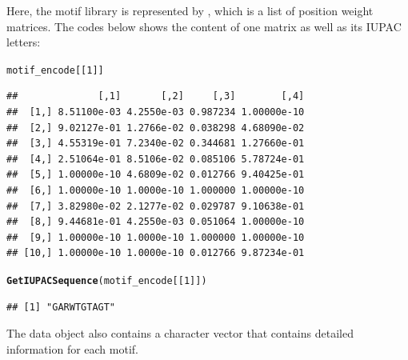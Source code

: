 \documentclass[a4paper,10pt]{article}\usepackage[]{graphicx}\usepackage[]{color}
\makeatletter
\newcommand{\hlnum}[1]{\textcolor[rgb]{0.686,0.059,0.569}{#1}}%
\newcommand{\hlstd}[1]{\textcolor[rgb]{0.345,0.345,0.345}{#1}}%
\newcommand{\hlkwd}[1]{\textcolor[rgb]{0.737,0.353,0.396}{\textbf{#1}}}%
\newenvironment{kframe}{%
 \def\at@end@of@kframe{}%
 \ifinner\ifhmode%
  \def\at@end@of@kframe{\end{minipage}}%
  \begin{minipage}{\columnwidth}%
 \fi\fi%
 \def\FrameCommand##1{\hskip\@totalleftmargin \hskip-\fboxsep
 \colorbox{shadecolor}{##1}\hskip-\fboxsep
     \hskip-\linewidth \hskip-\@totalleftmargin \hskip\columnwidth}%
 \MakeFramed {\advance\hsize-\width
   \@totalleftmargin\z@ \linewidth\hsize
   \@setminipage}}%
 {\par\unskip\endMakeFramed%
 \at@end@of@kframe}
\newenvironment{knitrout}{}{} %
\makeatother
\begin{document}
Here, the motif library is represented by ,
which is a list of position weight matrices. The codes below shows the
content of one matrix as well as its IUPAC letters:

\begin{knitrout}
\color{fgcolor}\begin{kframe}
\begin{alltt}
\hlstd{motif_encode[[}\hlnum{1}\hlstd{]]}
\end{alltt}
\begin{verbatim}
##              [,1]       [,2]     [,3]        [,4]
##  [1,] 8.51100e-03 4.2550e-03 0.987234 1.00000e-10
##  [2,] 9.02127e-01 1.2766e-02 0.038298 4.68090e-02
##  [3,] 4.55319e-01 7.2340e-02 0.344681 1.27660e-01
##  [4,] 2.51064e-01 8.5106e-02 0.085106 5.78724e-01
##  [5,] 1.00000e-10 4.6809e-02 0.012766 9.40425e-01
##  [6,] 1.00000e-10 1.0000e-10 1.000000 1.00000e-10
##  [7,] 3.82980e-02 2.1277e-02 0.029787 9.10638e-01
##  [8,] 9.44681e-01 4.2550e-03 0.051064 1.00000e-10
##  [9,] 1.00000e-10 1.0000e-10 1.000000 1.00000e-10
## [10,] 1.00000e-10 1.0000e-10 0.012766 9.87234e-01
\end{verbatim}
\begin{alltt}
\hlkwd{GetIUPACSequence}\hlstd{(motif_encode[[}\hlnum{1}\hlstd{]])}
\end{alltt}
\begin{verbatim}
## [1] "GARWTGTAGT"
\end{verbatim}
\end{kframe}
\end{knitrout}

The data object  also contains a character vector  that contains detailed information for each motif.
\end{document}
